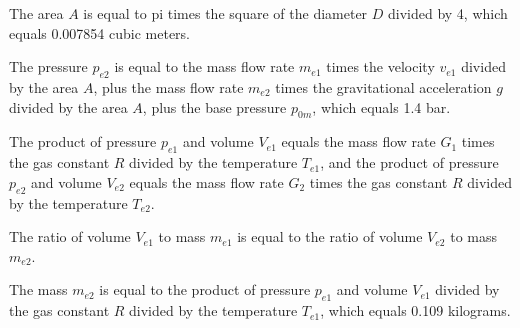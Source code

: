 The area \( A \) is equal to pi times the square of the diameter \( D \) divided by 4, which equals 0.007854 cubic meters.

The pressure \( p_{e2} \) is equal to the mass flow rate \( m_{e1} \) times the velocity \( v_{e1} \) divided by the area \( A \), plus the mass flow rate \( m_{e2} \) times the gravitational acceleration \( g \) divided by the area \( A \), plus the base pressure \( p_{0m} \), which equals 1.4 bar.

The product of pressure \( p_{e1} \) and volume \( V_{e1} \) equals the mass flow rate \( G_1 \) times the gas constant \( R \) divided by the temperature \( T_{e1} \), and the product of pressure \( p_{e2} \) and volume \( V_{e2} \) equals the mass flow rate \( G_2 \) times the gas constant \( R \) divided by the temperature \( T_{e2} \).

The ratio of volume \( V_{e1} \) to mass \( m_{e1} \) is equal to the ratio of volume \( V_{e2} \) to mass \( m_{e2} \).

The mass \( m_{e2} \) is equal to the product of pressure \( p_{e1} \) and volume \( V_{e1} \) divided by the gas constant \( R \) divided by the temperature \( T_{e1} \), which equals 0.109 kilograms.